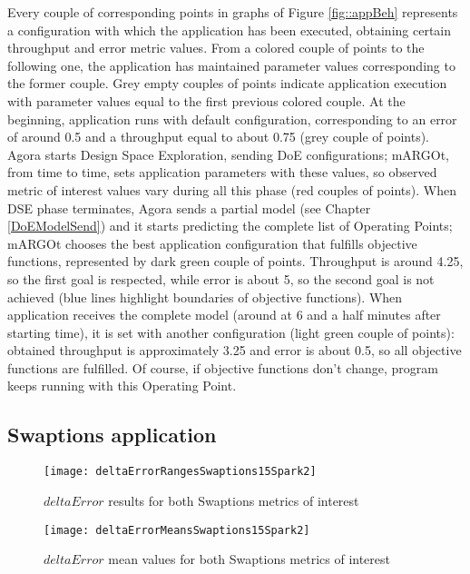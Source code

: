 Every couple of corresponding points in graphs of Figure \ref{fig::appBeh} represents a configuration with which the application has been executed, obtaining certain throughput and error metric values. From a colored couple of points to the following one, the application has maintained parameter values corresponding to the former couple. Grey empty couples of points indicate application execution with parameter values equal to the first previous colored couple. At the beginning, application runs with default configuration, corresponding to an error of around 0.5 and a throughput equal to about 0.75 (grey couple of points). Agora starts Design Space Exploration, sending DoE configurations; mARGOt, from time to time, sets application parameters with these values, so observed metric of interest values vary during all this phase (red couples of points). When DSE phase terminates, Agora sends a partial model (see Chapter \ref{DoEModelSend}) and it starts predicting the complete list of Operating Points; mARGOt chooses the best application configuration that fulfills objective functions, represented by dark green couple of points. Throughput is around 4.25, so the first goal is respected, while error is about 5, so the second goal is not achieved (blue lines highlight boundaries of objective functions). When application receives the complete model (around at 6 and a half minutes after starting time), it is set with another configuration (light green couple of points): obtained throughput is approximately 3.25 and error is about 0.5, so all objective functions are fulfilled. Of course, if objective functions don't change, program keeps running with this Operating Point.





\subsection{Swaptions application}

\begin{figure}[htb]

    \centering
    \texttt{[image: deltaErrorRangesSwaptions15Spark2]}
    \caption{$deltaError$ results for both Swaptions metrics of interest}
    \label{fig::swaptions15spark2::intervals}
    
\end{figure}

\begin{figure}[htb]

    \centering
    \texttt{[image: deltaErrorMeansSwaptions15Spark2]}
    \caption{$deltaError$ mean values for both Swaptions metrics of interest}
    \label{fig::swaptions15spark2::means}
    
\end{figure}	

